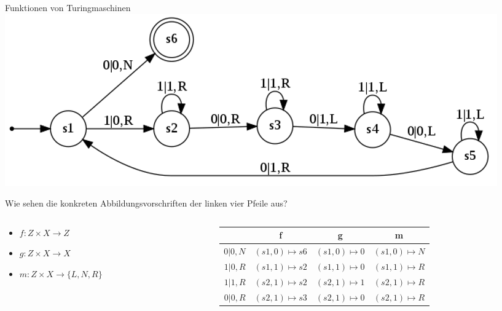 \documentclass[handout]{beamer}
\begin{document}
\begin{frame}{Funktionen von Turingmaschinen}
\includegraphics[scale=0.4]{images/turingexample_smallspacing.png}

Wie sehen die konkreten Abbildungsvorschriften der linken vier Pfeile aus?

\begin{columns}
\begin{column}{0.3\textwidth}

\vspace{.2cm}

\begin{itemize}
\item $f: Z \times X \rightarrow Z$
\item $g: Z \times X \rightarrow X$
\item $m: Z \times X \rightarrow \{L, N, R\}$
\end{itemize}
\end{column}

\begin{column}{0.7\textwidth}
\begin{tabular}{r || c | c | c}
& f & g & m\\\hline\hline

$0|0,N$ & $(s1, 0) \mapsto s6$ & $(s1, 0) \mapsto 0$ & $(s1, 0) \mapsto N$ \\\hline

\pause $1|0, R$ 
\pause & $(s1, 1) \mapsto s2$
\pause & $(s1, 1) \mapsto 0$
\pause & $(s1, 1) \mapsto R$ \\\hline

\pause $1|1, R$ 
\pause & $(s2, 1) \mapsto s2$
\pause & $(s2, 1) \mapsto 1$
\pause & $(s2, 1) \mapsto R$ \\\hline

\pause $0|0, R$ 
\pause & $(s2, 1) \mapsto s3$
\pause & $(s2, 1) \mapsto 0$
\pause & $(s2, 1) \mapsto R$ \\\hline

\end{tabular}
\end{column}
\end{columns}

\end{frame}
\end{document}
